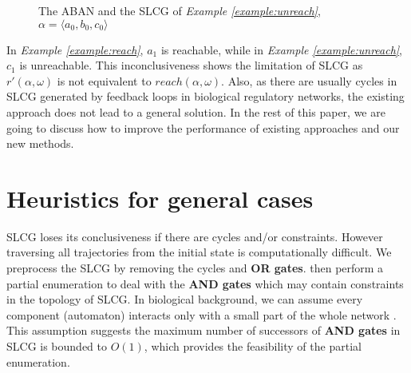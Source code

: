 \documentclass[runningheads]{llncs}
\begin{document}
\begin{figure}[ht]
\centering

\caption{The ABAN and the SLCG of \textit{Example \ref{example:unreach}}, $\alpha=\langle a_0,b_0,c_0\rangle$}
\label{fig:3}
\end{figure}
In \textit{Example \ref{example:reach}}, $a_1$ is reachable, while in \textit{Example \ref{example:unreach}}, $c_1$ is unreachable. This inconclusiveness shows the limitation of SLCG as $r'(\alpha,\omega)$ is not equivalent to $reach(\alpha,\omega)$.
Also, as there are usually cycles in SLCG generated by feedback loops in biological regulatory networks, the existing approach does not lead to a general solution.
In the rest of this paper, we are going to discuss how to improve the performance of existing approaches and our new methods. 

\section{Heuristics for general cases}\label{sect:4}
SLCG loses its conclusiveness if there are cycles and/or constraints.
However traversing all trajectories from the initial state is computationally difficult. 
We preprocess the SLCG by removing the cycles and \textbf{OR gates}.
then perform a partial enumeration to deal with the \textbf{AND gates} which may contain constraints in the topology of SLCG.
In biological background, we can assume every component (automaton) interacts only with a small part of the whole network \cite{akutsu2007control}.
This assumption suggests the maximum number of successors of \textbf{AND gates} in SLCG is bounded to $O(1)$, which provides the feasibility of the partial enumeration.
\end{document}
